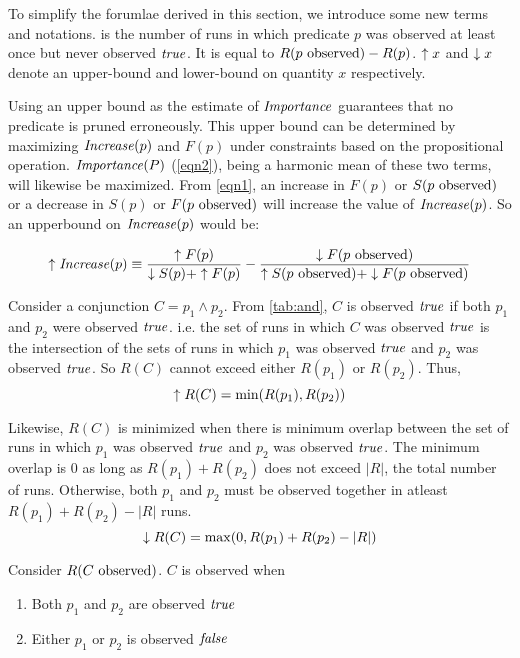 To simplify the forumlae derived in this section, we introduce some new terms and
notations.   is the number of runs in which predicate $p$ was observed
at least once but never observed $\mathit{true}$.  It is equal to $R(\text{$p$ observed}) - R(p)$.
$\uparrow x$ and $\downarrow x$ denote an upper-bound and lower-bound on quantity $x$
respectively.  

Using an upper bound as the estimate of $\mathit{Importance}$ guarantees that no 
predicate is pruned erroneously.  This upper bound can be determined by maximizing
$\mathit{Increase}(p)$ and $F(p)$ under constraints based on the propositional operation.
$\mathit{Importance}(P)$ (\autoref{eqn2}), being a harmonic mean of these two terms, will
likewise be maximized.  From \autoref{eqn1}, an increase in $F(p)$ or $S(\text{$p$ observed})$
or a decrease in $S(p)$ or $F(\text{$p$ observed})$ will increase the value of $\mathit{Increase}(p)$.
So an upperbound on $\mathit{Increase}(p)$ would be:

\begin{equation}
\label{eqn3}
\uparrow\mathit{Increase}(p) \equiv
\frac{\uparrow F(p)}{\downarrow S(p) + \uparrow F(p)}
-
\frac{\downarrow F(\text{$p$ observed})}{\uparrow S(\text{$p$ observed}) + \downarrow F(\text{$p$ observed})}
\end{equation}

Consider a conjunction $C = p_1 \wedge p_2$.  From \autoref{tab:and}, $C$ is
observed $\mathit{true}$ if both $p_1$ and $p_2$ were observed $\mathit{true}$.  i.e. the set
of runs in which $C$ was observed $\mathit{true}$ is the intersection of the sets of
runs in which $p_1$ was observed $\mathit{true}$ and $p_2$ was observed $\mathit{true}$.  So
$R(C)$ cannot exceed either $R(p_1)$ or $R(p_2)$.  Thus,
\begin{equation}
  \uparrow R(C) = \min(R(p_1), R(p_2))
\end{equation}

Likewise, $R(C)$ is minimized when there is minimum overlap between the set
of runs in which $p_1$ was observed $\mathit{true}$ and $p_2$ was observed $\mathit{true}$.
The minimum overlap is $0$ as long as $R(p_1) + R(p_2)$ does not exceed $|R|$,
the total number of runs.  Otherwise, both $p_1$ and $p_2$ must be observed
together in atleast $R(p_1) + R(p_2) - |R|$ runs.
\begin{equation}
  \downarrow R(C) = \max(0, R(p_1) + R(p_2) - |R|)
\end{equation}

Consider $R(\text{$C$ observed})$.  $C$ is observed when
\begin{enumerate}
\item Both $p_1$ and $p_2$ are observed $\mathit{true}$
\item Either $p_1$ or $p_2$ is observed $\mathit{false}$
\end{enumerate}

